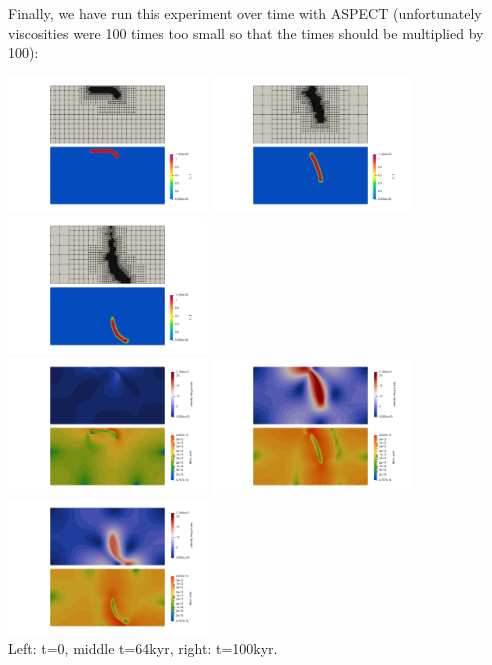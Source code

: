 \newpage
Finally, we have run this experiment over time with ASPECT (unfortunately viscosities were 100 times 
too small so that the times should be multiplied by 100):
\begin{center}
\includegraphics[width=5.26cm]{python_codes/fieldstone_55/images/aspect/grid_comp0000}
\includegraphics[width=5.26cm]{python_codes/fieldstone_55/images/aspect/grid_comp0090}
\includegraphics[width=5.26cm]{python_codes/fieldstone_55/images/aspect/grid_comp0180}\\
\includegraphics[width=5.26cm]{python_codes/fieldstone_55/images/aspect/vel_sr0000}
\includegraphics[width=5.26cm]{python_codes/fieldstone_55/images/aspect/vel_sr0090}
\includegraphics[width=5.26cm]{python_codes/fieldstone_55/images/aspect/vel_sr0180}\\
{\captionfont Left: t=0, middle t=64kyr, right: t=100kyr.}
\end{center}


